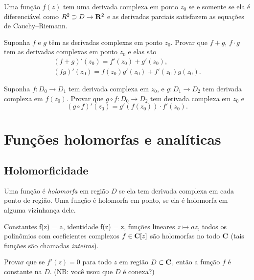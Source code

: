 \begin{teorema}
Uma função $f(z)$ tem uma derivada complexa em ponto $z_0$ se e somente se
ela é diferenciável como $R^2\supset D \to \mathbf{R}^2$ e as derivadas parciais
satisfazem as equações de Cauchy--Riemann.
\end{teorema}

\begin{problema}
Suponha $f$ e $g$ têm as derivadas complexas em ponto $z_0$.
Provar que $f+g$, $f\cdot g$ tem as derivadas complexas em ponto $z_0$
e elas são
\begin{gather}
(f+g)'(z_0) = f'(z_0)+g'(z_0), \\
(fg)'(z_0) = f(z_0) g'(z_0) + f'(z_0) g(z_0).
\end{gather}
\end{problema}

\begin{problema}
Suponha $f: D_0 \to D_1$ tem derivada complexa em $z_0$,
e $g : D_1 \to D_2$ tem derivada complexa em $f(z_0)$.
Provar que $g\circ f: D_0 \to D_2$ tem derivada complexa em $z_0$
e
\begin{equation}
(g\circ f)'(z_0) = g'(f(z_0)) \cdot f'(z_0).
\end{equation} 
\end{problema}

\section{Funções holomorfas e analíticas}

\subsection{Holomorficidade}

\begin{defin} Uma função é \emph{holomorfa} em região $D$ se ela tem derivada complexa em cada ponto de região.
Uma função é holomorfa em ponto, se ela é holomorfa em alguma vizinhança dele.
\end{defin}

\begin{exem}
Constantes f(z) = a,
identidade f(z) = z,
funções lineares $z \mapsto a z$,
todos os polinômios com coeficientes complexos $f \in \mathbf{C}[z]$
são holomorfas no todo $\mathbf{C}$ (tais funções são chamadas \emph{inteiras}).
\end{exem}

\begin{problema}
Provar que se $f'(z)=0$ para todo $z$ em região $D\subset \mathbf{C}$, então a função $f$ é constante na $D$.
(NB: você usou que $D$ é conexa?)
\end{problema}

